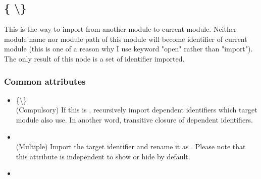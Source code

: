 \subsection{\kOpen {} \{ \kShowByDefault \textbackslash \kHideByDefault \} }

This is the way to import  from another module to current module. Neither module name nor module path of this module will become identifier of current module (this is one of a reason why I use keyword "open" rather than "import"). The only result of this node is a set of identifier imported.

\subsubsection{Common attributes}

\begin{itemize}
    \item \kRecursive \{\kTrue \textbackslash \kFalse\} \\
    (Compulsory) If this is \kTrue, recursively import dependent identifiers which target module also use. In another word, transitive closure of dependent identifiers.
    \item \kRename {} \kTo {} \\
    (Multiple) Import the target identifier and rename it as . Please note that this attribute is independent to show or hide by default.
    \item \kInject {} \kTo {} \\
\end{itemize}

